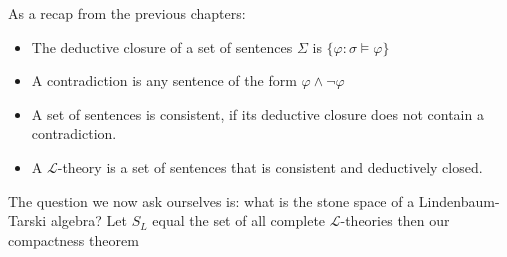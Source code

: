 As a recap from the previous chapters:
\begin{itemize}
    \item The deductive closure of a set of sentences $\Sigma$ is $\{\varphi : \sigma \models \varphi\}$
    \item A contradiction is any sentence of the form $\varphi \land \lnot \varphi$
    \item A set of sentences is consistent, if its deductive closure does not contain a contradiction.
    \item A $\mathcal{L}$-theory is a set of sentences that is consistent and deductively closed.
\end{itemize}

The question we now ask ourselves is: what is the stone space of a Lindenbaum-Tarski algebra?
Let $S_L$ equal the set of all complete $\mathcal{L}$-theories then our compactness theorem

